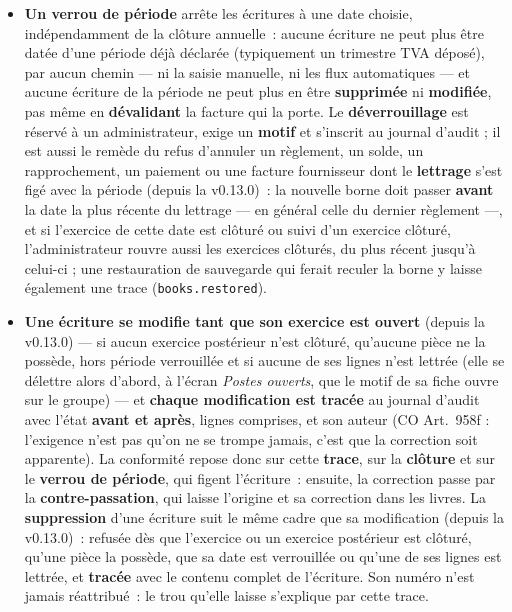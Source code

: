 \documentclass[a4paper,11pt,oneside]{article}
\begin{document}
\begin{itemize}
    \item \textbf{Un verrou de période} arrête les écritures à une date choisie, indépendamment de la clôture annuelle~: aucune écriture ne peut plus être datée d'une période déjà déclarée (typiquement un trimestre TVA déposé), par aucun chemin --- ni la saisie manuelle, ni les flux automatiques --- et aucune écriture de la période ne peut plus en être \textbf{supprimée} ni \textbf{modifiée}, pas même en \textbf{dévalidant} la facture qui la porte. Le \textbf{déverrouillage} est réservé à un administrateur, exige un \textbf{motif} et s'inscrit au journal d'audit ; il est aussi le remède du refus d'annuler un règlement, un solde, un rapprochement, un paiement ou une facture fournisseur dont le \textbf{lettrage} s'est figé avec la période (depuis la v0.13.0)~: la nouvelle borne doit passer \textbf{avant} la date la plus récente du lettrage --- en général celle du dernier règlement ---, et si l'exercice de cette date est clôturé ou suivi d'un exercice clôturé, l'administrateur rouvre aussi les exercices clôturés, du plus récent jusqu'à celui-ci ; une restauration de sauvegarde qui ferait reculer la borne y laisse également une trace (\texttt{books.restored}).
    \item \textbf{Une écriture se modifie tant que son exercice est ouvert} (depuis la v0.13.0) --- si aucun exercice postérieur n'est clôturé, qu'aucune pièce ne la possède, hors période verrouillée et si aucune de ses lignes n'est lettrée (elle se délettre alors d'abord, à l'écran \emph{Postes ouverts}, que le motif de sa fiche ouvre sur le groupe) --- et \textbf{chaque modification est tracée} au journal d'audit avec l'état \textbf{avant et après}, lignes comprises, et son auteur (CO Art.~958f : l'exigence n'est pas qu'on ne se trompe jamais, c'est que la correction soit apparente). La conformité repose donc sur cette \textbf{trace}, sur la \textbf{clôture} et sur le \textbf{verrou de période}, qui figent l'écriture~: ensuite, la correction passe par la \textbf{contre-passation}, qui laisse l'origine et sa correction dans les livres. La \textbf{suppression} d'une écriture suit le même cadre que sa modification (depuis la v0.13.0)~: refusée dès que l'exercice ou un exercice postérieur est clôturé, qu'une pièce la possède, que sa date est verrouillée ou qu'une de ses lignes est lettrée, et \textbf{tracée} avec le contenu complet de l'écriture. Son numéro n'est jamais réattribué~: le trou qu'elle laisse s'explique par cette trace.


\end{itemize}
\end{document}
